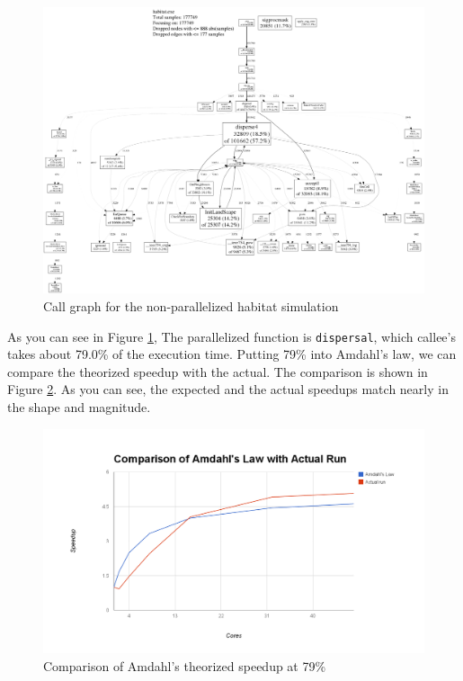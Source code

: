 \documentclass[12pt, notitlepage]{article}
\begin{document}
\begin{figure}[ht]
\includegraphics[width=\textwidth]{Include/originalcall.pdf}
\caption{Call graph for the non-parallelized habitat simulation} \label{fig:originalcall}
\end{figure}


As you can see in Figure \ref{fig:originalcall}, The parallelized function is \texttt{dispersal}, which callee's takes about 79.0\% of the execution time.  Putting 79\% into Amdahl's law, we can compare the theorized speedup with the actual.  The comparison is shown in Figure \ref{fig:amdahls}.  As you can see, the expected and the actual speedups match nearly in the shape and magnitude.  

\begin{figure}[ht]
\includegraphics[width=\textwidth]{Include/amdahls.png}
\caption{Comparison of Amdahl's theorized speedup at 79\%} \label{fig:amdahls}
\end{figure}
\end{document}
